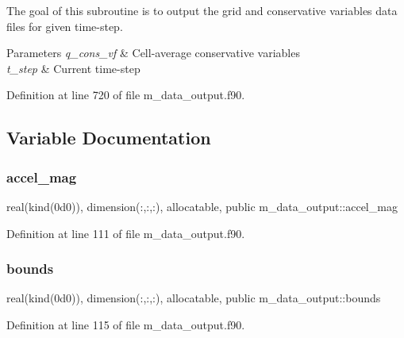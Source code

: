 The goal of this subroutine is to output the grid and conservative variables data files for given time-\/step. 


\begin{DoxyParams}{Parameters}
{\em q\+\_\+cons\+\_\+vf} & Cell-\/average conservative variables \\
\hline
{\em t\+\_\+step} & Current time-\/step \\
\hline
\end{DoxyParams}


Definition at line 720 of file m\+\_\+data\+\_\+output.\+f90.



\subsection{Variable Documentation}
\mbox{\label{namespacem__data__output_a1ccababc9891f8a719df1c52b49e969a}} 
\subsubsection{\texorpdfstring{accel\+\_\+mag}{accel\_mag}}
{\footnotesize\ttfamily real(kind(0d0)), dimension(\+:,\+:,\+:), allocatable, public m\+\_\+data\+\_\+output\+::accel\+\_\+mag}



Definition at line 111 of file m\+\_\+data\+\_\+output.\+f90.

\mbox{\label{namespacem__data__output_a1e7a93a0d32bbc7c691381689771b6f9}} 
\subsubsection{\texorpdfstring{bounds}{bounds}}
{\footnotesize\ttfamily real(kind(0d0)), dimension(\+:,\+:,\+:), allocatable, public m\+\_\+data\+\_\+output\+::bounds}



Definition at line 115 of file m\+\_\+data\+\_\+output.\+f90.

\mbox{\label{namespacem__data__output_a775b8128a9261b4d095f9132508d309f}} 
